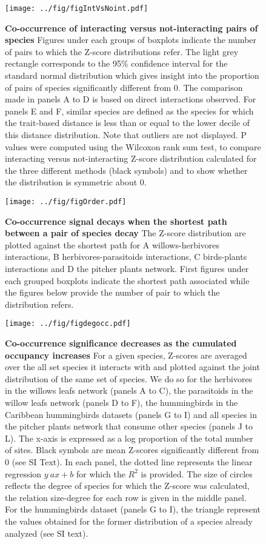 \newpage

\begin{figure}[htbp]
\centering
\texttt{[image: ../fig/figIntVsNoint.pdf]}
\caption{\textbf{Co-occurrence of interacting versus not-interacting
pairs of species} Figures under each groups of boxplots indicate the
number of pairs to which the Z-score distributions refer. The light grey
rectangle corresponds to the 95\% confidence interval for the standard
normal distribution which gives insight into the proportion of pairs of
species significantly different from 0. The comparison made in panels A
to D is based on direct interactions observed. For panels E and F,
similar species are defined as the species for which the trait-based
distance is less than or equal to the lower decile of this distance
distribution. Note that outliers are not displayed. P values were
computed using the Wilcoxon rank sum test, to compare interacting versus
not-interacting Z-score distribution calculated for the three different
methods (black symbols) and to show whether the distribution is
symmetric about 0.\label{fig:synth}}
\end{figure}

\newpage

\begin{figure}[htbp]
\centering
\texttt{[image: ../fig/figOrder.pdf]}
\caption{\textbf{Co-occurrence signal decays when the shortest path
between a pair of species decay } The Z-score distribution are plotted
against the shortest path for A willows-herbivores interactions, B
herbivores-parasitoids interactions, C birds-plants interactions and D
the pitcher plants network. First figures under each grouped boxplots
indicate the shortest path associated while the figures below provide
the number of pair to which the distribution refers.\label{fig:shtpth}}
\end{figure}

\newpage

\begin{figure}[htbp]
\centering
\texttt{[image: ../fig/figdegocc.pdf]}
\caption{\textbf{Co-occurrence significance decreases as the cumulated
occupancy increases} For a given species, Z-scores are averaged over the
all set species it interacts with and plotted against the joint
distribution of the same set of species. We do so for the herbivores in
the willows leafs network (panels A to C), the parasitoids in the willow
leafs network (panels D to F), the hummingbirds in the Caribbean
hummingbirds datasets (panels G to I) and all species in the pitcher
plants network that consume other species (panels J to L). The x-axis is
expressed as a log proportion of the total number of sites. Black
symbols are mean Z-scores significantly different from 0 (see SI Text).
In each panel, the dotted line represents the linear regression
\(y~ax+b\) for which the \(R^2\) is provided. The size of circles
reflects the degree of species for which the Z-score was calculated, the
relation size-degree for each row is given in the middle panel. For the
hummingbirds dataset (panels G to I), the triangle represent the values
obtained for the former distribution of a species already analyzed (see
SI text).\label{fig:degocc}}
\end{figure}

